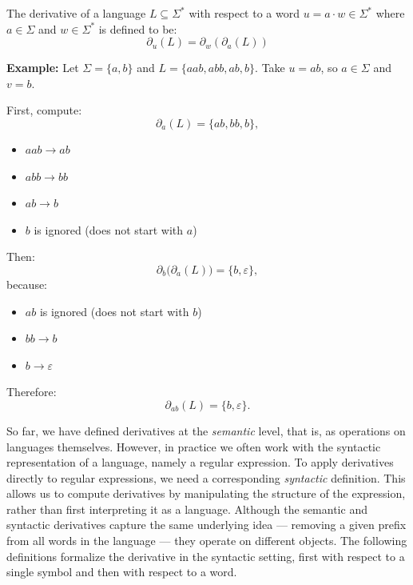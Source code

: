 \begin{definition}\label{def:derivative-string}
    The derivative of a language $L \subseteq \Sigma^*$ with respect to a word $u=a\cdot w \in \Sigma^*$ where $a \in \Sigma$ and $w \in \Sigma^*$ is defined to be:
    $$
        \partial_u(L)=\partial_w(\partial_a(L))
    $$

    \textbf{Example:} Let $\Sigma = \{a, b\}$ and $L = \{aab, abb, ab, b\}$.  
    Take $u = ab$, so $a \in \Sigma$ and $v = b$.  

    First, compute:
    \[
        \partial_a(L) = \{ab, bb, b\},
    \]

    \begin{itemize}
        \item $aab \to ab$
        \item $abb \to bb$
        \item $ab \to b$
        \item $b$ is ignored (does not start with $a$)
    \end{itemize}

    Then:
    \[
        \partial_b\big(\partial_a(L)\big) = \{b, \varepsilon\},
    \]
    because:
    \begin{itemize}
        \item $ab$ is ignored (does not start with $b$)
        \item $bb \to b$
        \item $b \to \varepsilon$
    \end{itemize}

    Therefore:
    \[
        \partial_{ab}(L) = \{b, \varepsilon\}.
    \]
\end{definition}

\noindent
So far, we have defined derivatives at the \emph{semantic} level, 
that is, as operations on languages themselves.  
However, in practice we often work with the syntactic representation of a language, 
namely a regular expression.  
To apply derivatives directly to regular expressions, we need a corresponding 
\emph{syntactic} definition.  
This allows us to compute derivatives by manipulating the structure of the 
expression, rather than first interpreting it as a language.  
Although the semantic and syntactic derivatives capture the same underlying idea 
--- removing a given prefix from all words in the language --- they operate on 
different objects.  
The following definitions formalize the derivative in the syntactic setting,
first with respect to a single symbol and then with respect to a word.


